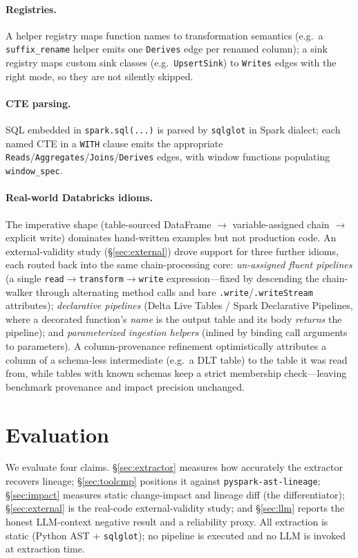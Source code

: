 \documentclass[11pt]{article}
\newcommand{\code}[1]{\texttt{#1}}
\begin{document}
\paragraph{Registries.} A helper registry maps function names to transformation
semantics (e.g.\ a \code{suffix_rename} helper emits one \code{Derives} edge per
renamed column); a sink registry maps custom sink classes (e.g.\ \code{UpsertSink})
to \code{Writes} edges with the right mode, so they are not silently skipped.

\paragraph{CTE parsing.} SQL embedded in \code{spark.\allowbreak sql(.\allowbreak .\allowbreak .\allowbreak )} is parsed by
\code{sqlglot} in Spark dialect; each named CTE in a \code{WITH} clause emits the
appropriate \code{Reads}/\code{Aggregates}/\code{Joins}/\code{Derives} edges, with
window functions populating \code{window_spec}.

\paragraph{Real-world Databricks idioms.} The imperative shape
(table-sourced DataFrame $\rightarrow$ variable-assigned chain $\rightarrow$
explicit write) dominates hand-written examples but not production code. An
external-validity study (\S\ref{sec:external}) drove support for three further
idioms, each routed back into the same chain-processing core: \emph{un-assigned
fluent pipelines} (a single \code{read}$\rightarrow$\code{transform}$\rightarrow$\code{write}
expression---fixed by descending the chain-walker through alternating method calls
and bare \code{.write}/\code{.writeStream} attributes); \emph{declarative pipelines}
(Delta Live Tables / Spark Declarative Pipelines, where a decorated function's
\emph{name} is the output table and its body \emph{returns} the pipeline); and
\emph{parameterized ingestion helpers} (inlined by binding call arguments to
parameters). A column-provenance refinement optimistically attributes a column of a
schema-less intermediate (e.g.\ a DLT table) to the table it was read from, while
tables with known schemas keep a strict membership check---leaving benchmark
provenance and impact precision unchanged.

\section{Evaluation}
We evaluate four claims. \S\ref{sec:extractor} measures how accurately the extractor
recovers lineage; \S\ref{sec:toolcmp} positions it against \code{pyspark-ast-lineage};
\S\ref{sec:impact} measures static change-impact and lineage diff (the
differentiator); \S\ref{sec:external} is the real-code external-validity study; and
\S\ref{sec:llm} reports the honest LLM-context negative result and a reliability
proxy. All extraction is static (Python AST + \code{sqlglot}); no pipeline is
executed and no LLM is invoked at extraction time.
\end{document}
